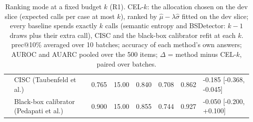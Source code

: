\begin{table}[t]
\begin{tabular}{llrrrrrl}
 & CISC (Taubenfeld et al.) & 0.765 & 15.00 & 0.840 & 0.708 & 0.862 & -0.185 [-0.368, -0.045] \\
 & Black-box calibrator (Pedapati et al.) & 0.900 & 15.00 & 0.855 & 0.744 & 0.927 & -0.050 [-0.200, +0.100] \\
\bottomrule
\end{tabular}
\caption{Ranking mode at a fixed budget $k$ (R1). CEL-$k$: the allocation chosen on the dev slice (expected calls per case at most $k$), ranked by $\hat\mu - \lambda\hat\sigma$ fitted on the dev slice; every baseline spends exactly $k$ calls (semantic entropy and BSDetector: $k-1$ draws plus their extra call), CISC and the black-box calibrator refit at each $k$. prec@10\% averaged over 10 batches; accuracy of each method's own answers; AUROC and AUARC pooled over the 500 items; $\Delta$ = method minus CEL-$k$, paired over batches.}
\label{tab:budget_curve}
\end{table}
